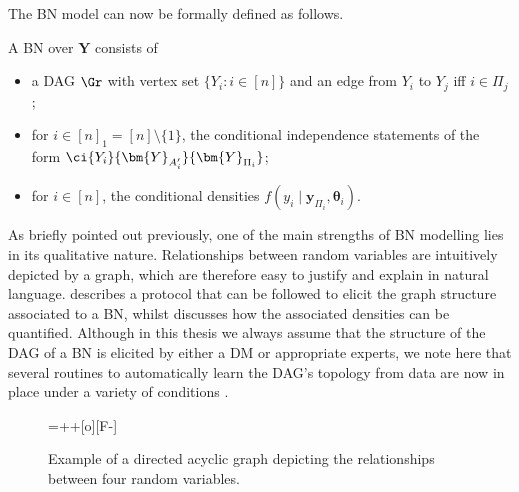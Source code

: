 The \gls{BN} model can now be formally defined as follows.
\begin{definition}
\label{def:BN}
A \gls{BN} over $\bm{Y}$ consists of 
\begin{itemize}
\item a \gls{DAG} $\Gr$ with vertex set $\{Y_i:i\in[n]\}$ and an edge from $Y_i$ to $Y_j$ iff $i\in \Pi_j$;
\item for $i\in[n]_1=[n]\setminus\{1\}$, the conditional independence statements of the form
$
\ci{Y_i}{\bm{Y}_{A_i'}}{\bm{Y}_{\Pi_i}}
$;
\item for $i\in[n]$, the conditional densities $f(y_i\;|\; \bm{y}_{\Pi_i}, \bm{\theta}_i)$.
\end{itemize}
\end{definition} 

As briefly pointed out previously, one of the main strengths of \gls{BN} modelling lies in its qualitative nature. Relationships between random variables are intuitively depicted by a graph, which are therefore easy to justify and explain in natural language. \citet{Smith2010} describes a protocol that can be followed to elicit the graph structure associated to a \gls{BN}, whilst \citet{OHagan2006} discusses how the associated densities can be quantified. Although in this thesis we always assume that the structure of the \gls{DAG} of a \gls{BN} is elicited by either a \gls{DM} or appropriate experts, we note here that several routines to automatically learn the \gls{DAG}'s topology from data are now in place under a variety of conditions \citep{Neapolitan2004, Cooper1999}.

\begin{figure}
\vspace{0.3cm}
\entrymodifiers={++[o][F-]}
\centerline{
}
\vspace{0.3cm}
\caption{
Example of a  directed acyclic graph depicting the relationships between four random variables. \label{fig:BNexample}}
\end{figure}

